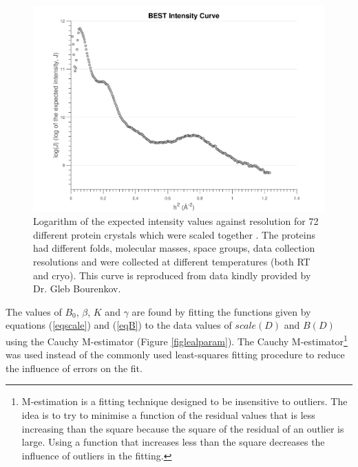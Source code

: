 \begin{figure}
    \centering
    \includegraphics[width=1\textwidth]{figures/dwd/bestcurve.pdf}
    \caption[\textit{BEST} intensity curve.]{Logarithm of the expected intensity values against resolution for 72 different protein crystals which were scaled together \cite{popov2003}. The proteins had different folds, molecular masses, space groups, data collection resolutions and were collected at different temperatures (both RT and cryo).
	This curve is reproduced from data kindly provided by Dr. Gleb Bourenkov.}
    \label{fig:BEST curve}
\end{figure}
The values of $B_0$, $\beta$, $K$ and $\gamma$ are found by fitting the functions given by equations (\ref{eqscale}) and (\ref{eqB}) to the data values of $scale(D)$ and $B(D)$ using the Cauchy M-estimator (Figure \ref{figlealparam}).
The Cauchy M-estimator\footnote{M-estimation is a fitting technique designed to be insensitive to outliers. The idea is to try to minimise a function of the residual values that is less increasing than the square because the square of the residual of an outlier is large. Using a function that increases less than the square decreases the influence of outliers in the fitting.} was used instead of the commonly used least-squares fitting procedure to reduce the influence of errors on the fit.
